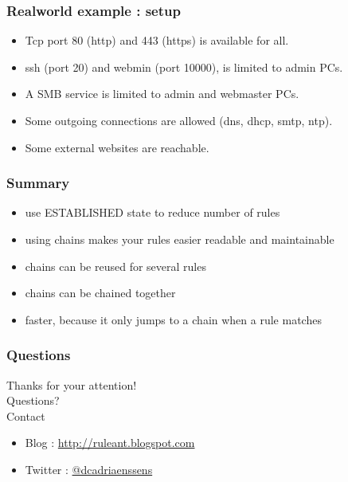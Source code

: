 \documentclass[14pt]{beamer}
\begin{document}
  \begin{frame}
    \frametitle{Realworld example : setup}
    \begin{itemize}
      \item Tcp port 80 (http) and 443 (https) is available for all.
      \item ssh (port 20) and webmin (port 10000), is limited to admin PCs.
      \item A SMB service is limited to admin and webmaster PCs.
      \item Some outgoing connections are allowed (dns, dhcp, smtp, ntp).
      \item Some external websites are reachable.
    \end{itemize}
  \end{frame}
  \begin{frame}
    \frametitle{Summary}
    \begin{itemize}
      \item use ESTABLISHED state to reduce number of rules
      \item using chains makes your rules easier readable and maintainable
      \item chains can be reused for several rules
      \item chains can be chained together
      \item faster, because it only jumps to a chain when a rule matches
    \end{itemize}
  \end{frame}
  \begin{frame}
   \frametitle{Questions}
    Thanks for your attention!\\
    Questions?\\
    Contact
    \begin{itemize}
      \item Blog : \href{http://ruleant.blogspot.com/}{http://ruleant.blogspot.com}
      \item Twitter : \href{https://twitter.com/dcadriaenssens}{@dcadriaenssens}
    \end{itemize}
  \end{frame}
\end{document}
